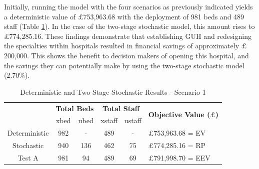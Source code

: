 \documentclass[../thesis.tex]{subfiles}
\begin{document}


Initially, running the model with the four scenarios as previously indicated yields a deterministic value of $\pounds$753,963.68 with the deployment of 981 beds and 489 staff (Table \ref{tab:Scenario1Results}). In the case of the two-stage stochastic model, this amount rises to $\pounds$774,285.16. These findings demonstrate that establishing GUH and redesigning the specialties within hospitals resulted in financial savings of approximately $\pounds$200,000. This shows the benefit to decision makers of opening this hospital, and the savings they can potentially make by using the two-stage stochastic model (2.70\%).


\begin{table}[h!]
    \centering
    \begin{tabular}{cccccl}\toprule
 & \multicolumn{2}{l}{\textbf{Total Beds}} & \multicolumn{2}{c}{\textbf{Total Staff}} & \multirow{2}{*}{\textbf{Objective Value ($\pounds$)}}\\ \cmidrule(lr){2-3} \cmidrule(lr){4-5}
         
 & xbed           & ubed          & xstaff         & ustaff         \\ \midrule
 Deterministic & 982 & - & 489 & - & $\pounds$753,963.68 = EV \\
 Stochastic & 940 & 136 & 462 & 75 & $\pounds$774,285.16 = RP \\
 Test A & 981 & 94 & 489 & 69 & $\pounds$791,998.70
 = EEV \\\bottomrule
    \end{tabular}
    \caption{Deterministic and Two-Stage Stochastic Results - Scenario 1}
    \label{tab:Scenario1Results}
\end{table}
\end{document}
